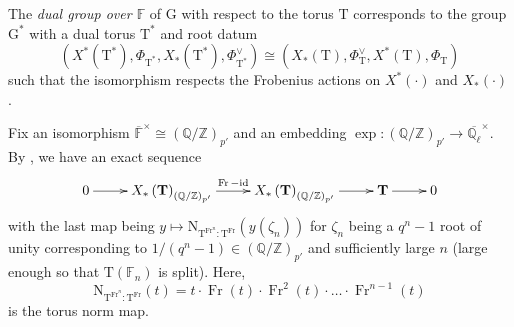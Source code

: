 \documentclass[12pt, reqno]{amsart}
\theoremstyle{definition}
\theoremstyle{definition}
\theoremstyle{definition}
\newcommand{\multiplicativegroup}[1]{#1^{\times}}
\newcommand{\idmap}{\mathrm{id}}
\newcommand{\aFieldNorm}{\mathrm{N}}
\newcommand{\finiteField}{\mathbb{F}}
\newcommand{\finiteFieldExtension}[1]{\finiteField_{#1}}
\newcommand{\algebraicClosure}[1]{\overline{#1}}
\newcommand{\Frobenius}{\operatorname{Fr}}
\newcommand{\algebraicGroup}[1]{\boldsymbol{\mathrm{#1}}}
\newcommand{\CharacterLattice}[1]{X^{\ast}\left(#1\right)}
\newcommand{\CocharacterLattice}[1]{X_{\ast}\left(#1\right)}
\begin{document}
The \emph{dual group over $\finiteField$} of $\algebraicGroup{G}$ with respect to the torus $\algebraicGroup{T}$ corresponds to the group $\algebraicGroup{G}^*$ with a dual torus $\algebraicGroup{T}^*$ and root datum
\[
(\CharacterLattice{\algebraicGroup{T}^*},\Phi_{\algebraicGroup{T}^*},\CocharacterLattice{\algebraicGroup{T}^*},\Phi_{\algebraicGroup{T}^*}^\vee) \cong (\CocharacterLattice{\algebraicGroup{T}},\Phi_{\algebraicGroup{T}}^\vee,\CharacterLattice{\algebraicGroup{T}},\Phi_{\algebraicGroup{T}})
\]
such that the isomorphism respects the Frobenius actions on $\CharacterLattice{\cdot}$ and $\CocharacterLattice{\cdot}$.

Fix an isomorphism $\multiplicativegroup{\algebraicClosure{\finiteField}} \cong (\mathbb{Q}/\mathbb{Z})_{p'}$ and an embedding $\exp:(\mathbb{Q}/\mathbb{Z})_{p'} \to \overline{\mathbb{Q}_\ell}^\times$. 
By \cite[Proposition 13.7 (ii)]{DigneMichel1991}, we have an exact sequence
\begin{equation}
	\label{eq:DL}
	\xymatrix{0 \ar[r] & \CocharacterLattice{\algebraicGroup{T}}_{(\mathbb{Q}/\mathbb{Z})_{p'}} \ar[r]^{\Frobenius-\idmap} & \CocharacterLattice{\algebraicGroup{T}}_{(\mathbb{Q}/\mathbb{Z})_{p'}} \ar[r] & \algebraicGroup{T} \ar[r] & 0}
\end{equation}
with the last map being $y \mapsto \aFieldNorm_{\algebraicGroup{T}^{\Frobenius^n}:\algebraicGroup{T}^{\Frobenius}}(y(\zeta_n))$
for $\zeta_n$ being a $q^n-1$ root of unity corresponding to $1/(q^n-1) \in (\mathbb{Q}/\mathbb{Z})_{p'}$ and sufficiently large $n$ (large enough so that $\algebraicGroup{T}\left(\finiteFieldExtension{n}\right)$ is split). Here, $$\aFieldNorm_{\algebraicGroup{T}^{\Frobenius^n}:\algebraicGroup{T}^{\Frobenius}}(t) = t\cdot \Frobenius(t)\cdot \Frobenius^2(t)\cdot  \hdots \cdot \Frobenius^{n-1}(t)$$ is the torus norm map.
\end{document}

